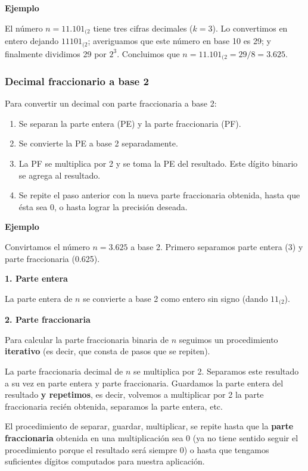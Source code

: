 \documentclass[spanish,a4paper,]{article}
\providecommand{\tightlist}{%
  \setlength{\itemsep}{0pt}\setlength{\parskip}{0pt}}
\begin{document}
\textbf{Ejemplo}

El número \(n = 11.101_{(2}\) tiene tres cifras decimales (\(k = 3\)).
Lo convertimos en entero dejando \(11101_{(2}\); averiguamos que este
número en base 10 es 29; y finalmente dividimos 29 por \(2^3\).
Concluimos que \(n = 11.101_{(2} = 29/8 = 3.625\).

\hypertarget{decimal-fraccionario-a-base-2}{%
\subsubsection{Decimal fraccionario a base
2}\label{decimal-fraccionario-a-base-2}}

Para convertir un decimal con parte fraccionaria a base 2:

\begin{enumerate}
\def\labelenumi{\arabic{enumi}.}
\tightlist
\item
  Se separan la parte entera (PE) y la parte fraccionaria (PF).
\item
  Se convierte la PE a base 2 separadamente.
\item
  La PF se multiplica por 2 y se toma la PE del resultado. Este dígito
  binario se agrega al resultado.
\item
  Se repite el paso anterior con la nueva parte fraccionaria obtenida,
  hasta que ésta sea 0, o hasta lograr la precisión deseada.
\end{enumerate}

\textbf{Ejemplo}

Convirtamos el número \(n = 3.625\) a base 2. Primero separamos parte
entera (3) y parte fraccionaria (0.625).

\textbf{1. Parte entera}

La parte entera de \(n\) se convierte a base 2 como entero sin signo
(dando \(11_{(2}\)).

\textbf{2. Parte fraccionaria}

Para calcular la parte fraccionaria binaria de \(n\) seguimos un
procedimiento \textbf{iterativo} (es decir, que consta de pasos que se
repiten).

La parte fraccionaria decimal de \(n\) se multiplica por 2. Separamos
este resultado a su vez en parte entera y parte fraccionaria. Guardamos
la parte entera del resultado \textbf{y repetimos}, es decir, volvemos a
multiplicar por 2 la parte fraccionaria recién obtenida, separamos la
parte entera, etc.

El procedimiento de separar, guardar, multiplicar, se repite hasta que
la \textbf{parte fraccionaria} obtenida en una multiplicación sea 0 (ya
no tiene sentido seguir el procedimiento porque el resultado será
siempre 0) o hasta que tengamos suficientes dígitos computados para
nuestra aplicación.
\end{document}
